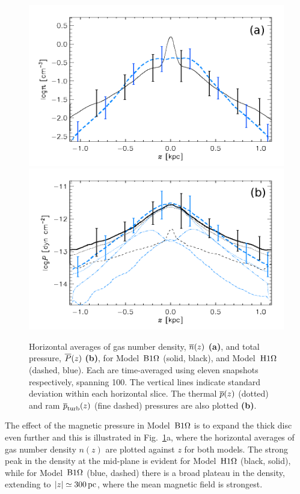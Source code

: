   \begin{figure}
  \centering
  \includegraphics[width=0.9\columnwidth]{fig/zrhom.png}
  \includegraphics[width=0.9\columnwidth]{fig/zrppm.png}
    \caption[Horizontal averages of $n$ and $P$ for Model~$\Ompa$ and $\Omph$]{
  Horizontal averages of gas number density, $\overline{n}(z)$ {\textbf{(a)}}, and
  total pressure, $\overline{P}(z)$ {\textbf{(b)}}, for Model~{$\Ompa$} (solid,
  black), and Model~{$\Omph$} (dashed, blue). 
  Each are time-averaged using eleven snapshots respectively, spanning 
  100\Myr.
  The vertical lines indicate standard deviation within each horizontal slice.
  The thermal $\overline{p}(z)$ (dotted) and ram $\overline{p}_{\rm turb}(z)$ (fine dashed)
  pressures are also plotted {\textbf{(b)}}.
    \label{fig:zrhom}
            }
  \end{figure}

  The effect of the magnetic pressure in Model~$\Ompa$ is to 
  expand the thick disc even further and this is illustrated in 
  Fig.~\ref{fig:zrhom}a, where the horizontal averages of gas number density
  $n(z)$ are plotted against $z$ for both models. 
  The strong peak in the density at the mid-plane is evident for Model~$\Omph$
  (black, solid), while for Model~$\Ompa$ (blue, dashed) there is a broad
  plateau in the density, extending to $|z|\simeq300\,{\rm pc}$, where the mean 
  magnetic field is strongest.
  
